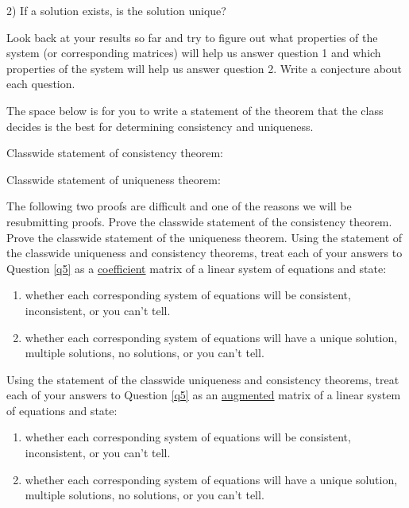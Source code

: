 2) If a solution exists, is the solution unique?

\begin{question} Look back at your results so far and try to figure out what properties of the system (or corresponding matrices) will help us answer question 1 and which properties of the system will help us answer question 2. Write a conjecture about each question. \end{question}

The space below is for you to write a statement of the theorem that the class decides is the best for determining consistency and uniqueness.
\begin{theorem}
Classwide statement of consistency theorem:
\vspace{2.5in}

\end{theorem}

\begin{theorem}
Classwide statement of uniqueness theorem:
\vspace{2.5in}

\end{theorem}
The following two proofs are difficult and one of the reasons we will be resubmitting proofs.
\bq Prove the classwide statement of the consistency theorem.
\eq
\bq Prove the classwide statement of the uniqueness theorem.
\eq
\bq Using the statement of the classwide uniqueness and consistency theorems, treat each of your answers to Question \ref{q5} as a \underline{coefficient} matrix of a linear system of equations and state:
\begin{enumerate}
\item whether each corresponding system of equations will be consistent, inconsistent, or you can't tell.
\item whether each corresponding system of equations will have a unique solution, multiple solutions, no solutions, or you can't tell.
\end{enumerate}
\eq
\bq Using the statement of the classwide uniqueness and consistency theorems, treat each of your answers to Question \ref{q5} as an \underline{augmented} matrix of a linear system of equations and state:
\begin{enumerate}
\item whether each corresponding system of equations will be consistent, inconsistent, or you can't tell.
\item whether each corresponding system of equations will have a unique solution, multiple solutions, no solutions, or you can't tell.
\end{enumerate}
\eq

